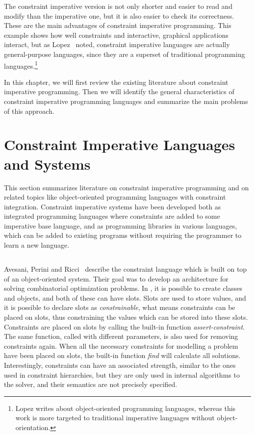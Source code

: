 The constraint imperative version is not only shorter and easier to
read and modify than the imperative one, but it is also easier to
check its correctness.  These are the main advantages of constraint
imperative programming.  This example shows how well constraints and
interactive, graphical applications interact, but as
Lopez~\cite{lopez97phd} noted, constraint imperative languages are
actually general-purpose languages, since they are a superset of
traditional programming languages.\footnote{Lopez writes about
  object-oriented programming languages, whereas this work is more
  targeted to traditional imperative languages without
  object-orientation.}

In this chapter, we will first review the existing literature about
constraint imperative programming.  Then we will identify the general
characteristics of constraint imperative programming languages and
summarize the main problems of this approach.

\section{Constraint Imperative Languages and Systems}

This section summarizes literature on constraint imperative
programming and on related topics like object-oriented programming
languages with constraint integration.  Constraint imperative systems
have been developed both as integrated programming languages where
constraints are added to some imperative base language, and as
programming libraries in various languages, which can be added to
existing programs without requiring the programmer to learn a new
language.

\subsection{\cool}
%
Avesani, Perini and Ricci~\cite{avesani90cool} describe the constraint
language \cool{} which is built on top of an object-oriented system.
Their goal was to develop an architecture for solving combinatorial
optimization problems.  In \cool{}, it is possible to create classes
and objects, and both of these can have slots.  Slots are used to
store values, and it is possible to declare slots as {\em
  constrainable}, what means constraints can be placed on slots, thus
constraining the values which can be stored into these slots.
Constraints are placed on slots by calling the built-in function {\em
  assert-constraint}.  The same function, called with different
parameters, is also used for removing constraints again. When all the
necessary constraints for modelling a problem have been placed on
slots, the built-in function {\em find} will calculate all solutions.
Interestingly, constraints can have an associated strength, similar to
the ones used in constraint hierarchies, but they are only used in
internal algorithms to the solver, and their semantics are not
precisely specified.

